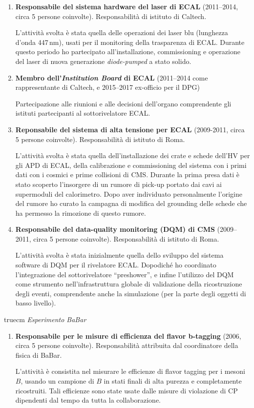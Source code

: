 \documentclass[11pt,twoside,a4paper]{article}
\begin{document}
\begin{enumerate}
\item \textbf{Responsabile del sistema hardware del laser di ECAL}
  (2011--2014, circa 5 persone coinvolte). Responsabilit\`a di
  istituto di Caltech.
  
  L'attivit\`a svolta \`e stata quella delle operazioni dei laser blu
  (lunghezza d'onda 447\,nm), usati per il monitoring della
  trasparenza di ECAL. Durante questo periodo ho partecipato
  all'installazione, commissioning e operazione del laser di nuova
  generazione \textit{diode-pumped} a stato solido.

\item \textbf{Membro dell'\textit{Institution Board} di ECAL}
  (2011--2014 come rappresentante di Caltech, e 2015--2017 ex-officio
  per il DPG)

  Partecipazione alle riunioni e alle decisioni dell'organo
  comprendente gli istituti partecipanti al sottorivelatore ECAL.
  
\item \textbf{Reponsabile del sistema di alta tensione per ECAL} (2009-2011,
  circa 5 persone coinvolte). Responsabilit\`a di istituto di Roma.
  
  L'attivit\`a svolta \`e stata quella dell'installazione dei crate e
  schede dell'HV per gli APD di ECAL, della calibrazione e
  commissioning del sistema con i primi dati con i cosmici e prime
  collisioni di CMS.  Durante la prima presa dati \`e stato scoperto
  l'insorgere di un rumore di pick-up portato dai cavi ai supermoduli
  del calorimetro. Dopo aver individuato personalmente l'origine del
  rumore ho curato la campagna di modifica del grounding delle schede
  che ha permesso la rimozione di questo rumore.
  
\item \textbf{Responsabile del data-quality monitoring (DQM) di CMS}
  (2009--2011, circa 5 persone coinvolte). Responsabilit\`a di
  istituto di Roma.
  
  L'attivit\`a svolta \`e stata inizialmente quella dello sviluppo del
  sistema software di DQM per il rivelatore ECAL. Dopodich\'e ho
  coordinato l'integrazione del sottorivelatore ``preshower'', e
  infine l'utilizzo del DQM come strumento nell'infrastruttura globale
  di validazione della ricostruzione degli eventi, comprendente anche
  la simulazione (per la parte degli oggetti di basso livello).
  
    
\end{enumerate}

 truecm
\textit{Esperimento BaBar}
\begin{enumerate}
\item \textbf{Responsabile per le misure di efficienza del flavor b-tagging}
  (2006, circa 5 persone coinvolte). Responsabilit\`a attribuita dal
  coordinatore della fisica di BaBar.

  L'attivit\`a \`e consistita nel misurare le efficienze di flavor
  tagging per i mesoni $B$, usando un campione di $B$ in stati finali
  di alta purezza e completamente ricostruiti. Tali efficienze sono
  state usate dalle misure di violazione di CP dipendenti dal tempo da
  tutta la collaborazione.
\end{enumerate}
\end{document}
